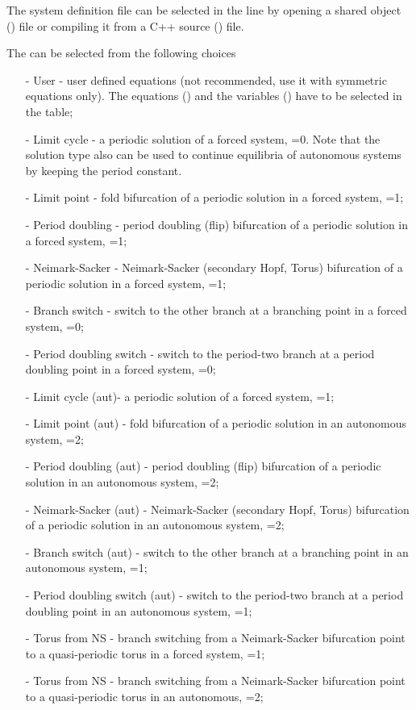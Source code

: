 \documentclass[10pt,a4paper]{ddedoc}
\begin{document}
The system definition file can be selected in the  line by
opening a shared object () file or compiling it from a C++ source
() file.

The  can be selected from the following choices
\begin{itemize}
\item[-] User - user defined equations (not recommended, use
it with symmetric equations only). The equations () and the
variables () have to be selected in the table;
\item[-] Limit cycle - a periodic solution of a forced system, =0. Note that the solution type also can be used to continue equilibria of autonomous systems by keeping the period constant.
\item[-] Limit point - fold bifurcation of a periodic solution in a forced
system, =1;
\item[-] Period doubling - period doubling (flip) bifurcation of a periodic
solution in a forced system, =1;
\item[-] Neimark-Sacker - Neimark-Sacker (secondary Hopf, Torus) bifurcation of
a periodic solution in a forced system, =1;
\item[-] Branch switch - switch to the other branch at a branching point in a
forced system, =0;
\item[-] Period doubling switch - switch to the period-two branch at a period
doubling point in a forced system, =0;
\item[-] Limit cycle (aut)- a periodic solution of a forced system,
=1;
\item[-] Limit point (aut) - fold bifurcation of a periodic solution in an
autonomous system, =2;
\item[-] Period doubling (aut) - period doubling (flip) bifurcation of a
periodic solution in an autonomous system, =2;
\item[-] Neimark-Sacker (aut) - Neimark-Sacker (secondary Hopf, Torus)
bifurcation of a periodic solution in an autonomous system, =2;
\item[-] Branch switch (aut) - switch to the other branch at a branching point
in an autonomous system, =1;
\item[-] Period doubling switch (aut) - switch to the period-two branch at a
period doubling point in an autonomous system, =1;
\item[-] Torus from NS - branch switching from a Neimark-Sacker bifurcation
point to a quasi-periodic torus in a forced system, =1;
\item[-] Torus from NS - branch switching from a Neimark-Sacker bifurcation
point to a quasi-periodic torus in an autonomous, =2;
\end{itemize}
\end{document}
